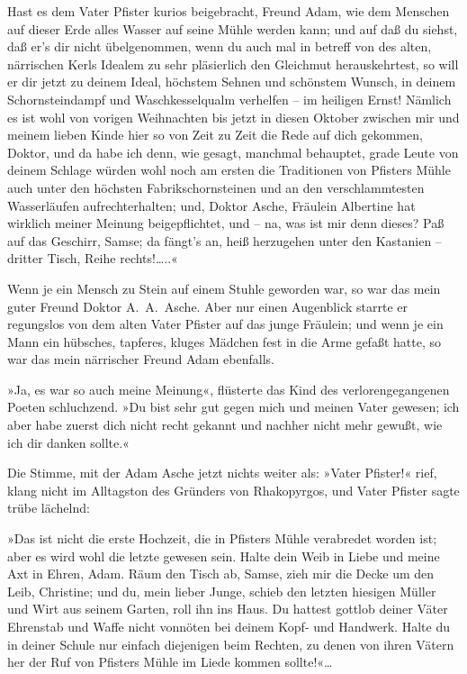 Hast es dem Vater Pfister kurios beigebracht, Freund Adam, wie dem
Menschen auf dieser Erde alles Wasser auf seine Mühle werden kann;
und auf daß du siehst, daß er's dir nicht übelgenommen, wenn du
auch mal in betreff von des alten, närrischen Kerls Idealem zu sehr
pläsierlich den Gleichmut herauskehrtest, so will er dir jetzt zu
deinem Ideal, höchstem Sehnen und schönstem Wunsch, in deinem
Schornsteindampf und Waschkesselqualm verhelfen – im heiligen
Ernst! Nämlich es ist wohl von vorigen Weihnachten bis jetzt in
diesen Oktober zwischen mir und meinem lieben Kinde hier so von
Zeit zu Zeit die Rede auf dich gekommen, Doktor, und da habe ich
denn, wie gesagt, manchmal behauptet, grade Leute von deinem
Schlage würden wohl noch am ersten die Traditionen von Pfisters
Mühle auch unter den höchsten Fabrikschornsteinen und an den
verschlammtesten Wasserläufen aufrechterhalten; und, Doktor Asche,
Fräulein Albertine hat wirklich meiner Meinung beigepflichtet, und
– na, was ist mir denn dieses? Paß auf das Geschirr, Samse; da
fängt's an, heiß herzugehen unter den Kastanien – dritter Tisch,
Reihe rechts!\ldots{}..«

Wenn je ein Mensch zu Stein auf einem Stuhle geworden war, so war
das mein guter Freund Doktor A.~A.~Asche. Aber nur einen Augenblick
starrte er regungslos von dem alten Vater Pfister auf das junge
Fräulein; und wenn je ein Mann ein hübsches, tapferes, kluges
Mädchen fest in die Arme gefaßt hatte, so war das mein närrischer
Freund Adam ebenfalls.

»Ja, es war so auch meine Meinung«, flüsterte das Kind des
verlorengegangenen Poeten schluchzend. »Du bist sehr gut gegen mich
und meinen Vater gewesen; ich aber habe zuerst dich nicht recht
gekannt und nachher nicht mehr gewußt, wie ich dir danken sollte.«

Die Stimme, mit der Adam Asche jetzt nichts weiter als: »Vater
Pfister!« rief, klang nicht im Alltagston des Gründers von
Rhakopyrgos, und Vater Pfister sagte trübe lächelnd:

»Das ist nicht die erste Hochzeit, die in Pfisters Mühle verabredet
worden ist; aber es wird wohl die letzte gewesen sein. Halte dein
Weib in Liebe und meine Axt in Ehren, Adam. Räum den Tisch ab,
Samse, zieh mir die Decke um den Leib, Christine; und du, mein
lieber Junge, schieb den letzten hiesigen Müller und Wirt aus
seinem Garten, roll ihn ins Haus. Du hattest gottlob deiner Väter
Ehrenstab und Waffe nicht vonnöten bei deinem Kopf- und Handwerk.
Halte du in deiner Schule nur einfach diejenigen beim Rechten, zu
denen von ihren Vätern her der Ruf von Pfisters Mühle im Liede
kommen sollte!«\ldots{}

